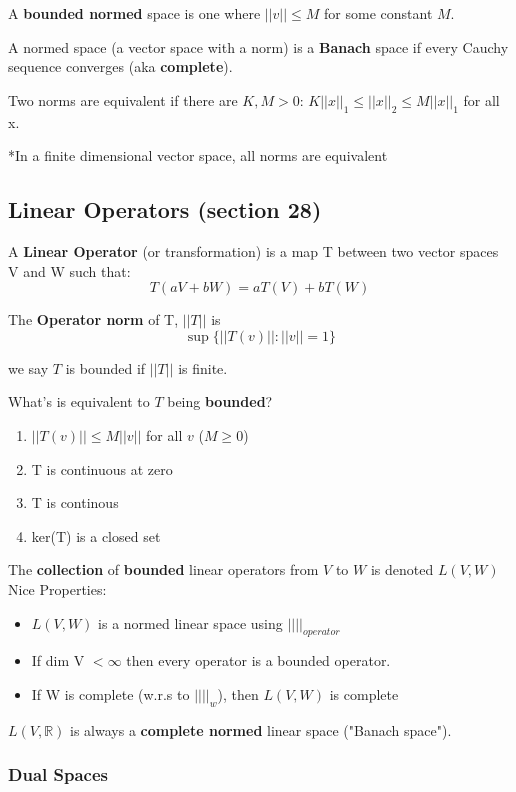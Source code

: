 \documentclass[a4paper, 12pt]{article}
\def\R{\ensuremath{\mathbb{R}}} %
\newcommand{\bt}[1]{\textbf{#1}} %
\begin{document}
\begin{multicols}{2}
A \bt{bounded normed} space is one where $||v|| \leq M$ for some constant $M$.

A normed space (a vector space with a norm) is a \bt{Banach} space if every Cauchy sequence
converges (aka \bt{complete}).

Two norms are equivalent if there are $K, M > 0$: 
$K ||x||_1 \leq ||x||_2 \leq M ||x||_1$ for all x.

*In a finite dimensional vector space, all norms are equivalent

\subsection{Linear Operators (section 28)}

A \bt{Linear Operator} (or transformation) is a map T between two 
vector spaces V and W such that: 
$$T(aV + bW) = aT(V) + bT(W)$$

The \bt{Operator norm} of T, $||T||$ is 
$$\sup\{ ||T(v) ||: ||v|| = 1\}$$

we say $T$ is bounded if $||T||$ is finite.

What's is equivalent to $T$ being \bt{bounded}?
\begin{enumerate}
    \item $||T(v)|| \leq M ||v||$ for all $v$ ($M \geq 0$)
    \item T is continuous at zero
    \item T is continous
    \item ker(T) is a closed set
\end{enumerate}

The \bt{collection} of \bt{bounded} linear operators from $V$ to $W$ is 
denoted $L(V, W)$ \\

Nice Properties:
\begin{itemize}
    \item $L(V, W)$ is a normed linear space using $|| ||_{operator}$
    \item If dim V $< \infty$ then every operator is a bounded operator. 
    \item If W is complete (w.r.s to $|| ||_w$), then $L(V, W)$ is complete
\end{itemize}

$L(V, \R)$ is always a \bt{complete normed} linear space ("Banach space").

\subsubsection{Dual Spaces}


\end{multicols}
\end{document}
